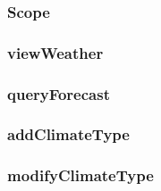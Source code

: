 \subsubsection{Scope}


\subsubsection{viewWeather}

\subsubsection{queryForecast}

\subsubsection{addClimateType}

\subsubsection{modifyClimateType}
